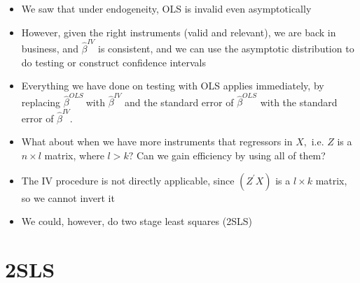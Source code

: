 \documentclass[notes=show]{beamer}
\begin{document}
\begin{frame}%


\begin{itemize}
\item We saw that under endogeneity, OLS is invalid even asymptotically

\item However, given the right instruments (valid and relevant), we are back
in business, and $\widehat{\beta }^{IV}$ is consistent, and we can use the
asymptotic distribution to do testing or construct confidence intervals

\item Everything we have done on testing with OLS applies immediately, by
replacing $\widehat{\beta }^{OLS}\ $with $\widehat{\beta }^{IV}$ and the
standard error of $\widehat{\beta }^{OLS}$ with the standard error of $%
\widehat{\beta }^{IV}.$

\item What about when we have more instruments that regressors in $X,$ i.e. $%
Z$ is a $n\times l$ matrix, where $l>k?$ Can we gain efficiency by using all
of them?

\item The IV procedure is not directly applicable, since $(Z^{\prime }X)$ is
a $l\times k$ matrix, so we cannot invert it

\item We could, however, do two stage least squares (2SLS)
\end{itemize}

\end{frame}%

\section{2SLS}
\end{document}
